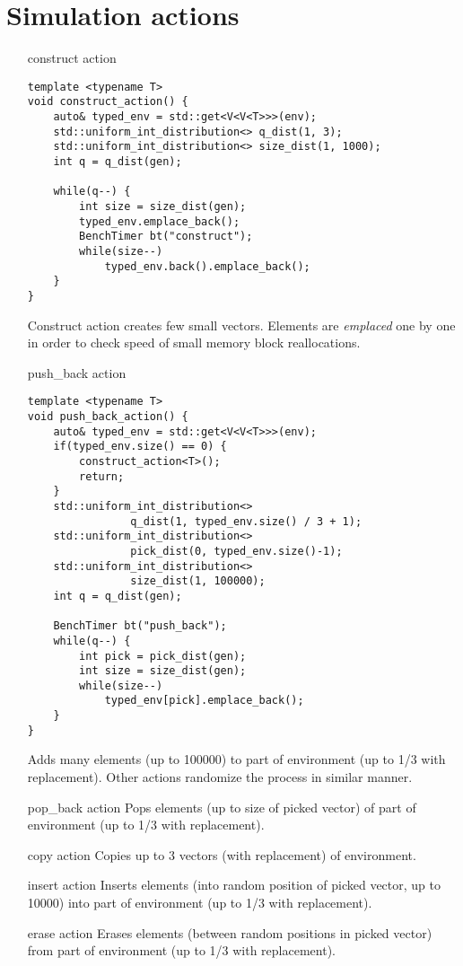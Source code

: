 \documentclass[inz, english, shortabstract]{iithesis}
\begin{document}
\section{Simulation actions}
\begin{itemize}
\item [construct action]
\begin{lstlisting}[caption=construct action]
template <typename T>
void construct_action() {
	auto& typed_env = std::get<V<V<T>>>(env);
	std::uniform_int_distribution<> q_dist(1, 3);
	std::uniform_int_distribution<> size_dist(1, 1000);
	int q = q_dist(gen);
	
	while(q--) {
		int size = size_dist(gen);
		typed_env.emplace_back();
		BenchTimer bt("construct");
		while(size--)
			typed_env.back().emplace_back();
	}
}
\end{lstlisting}
Construct action creates few small vectors. Elements are {\it emplaced} one by one in order to check speed of small memory block reallocations. 

\item [push\_back action]
\begin{lstlisting}[caption=push\_back action]
template <typename T>
void push_back_action() {
	auto& typed_env = std::get<V<V<T>>>(env);
	if(typed_env.size() == 0) {
		construct_action<T>();
		return;
	}
	std::uniform_int_distribution<> 
				q_dist(1, typed_env.size() / 3 + 1);
	std::uniform_int_distribution<> 
				pick_dist(0, typed_env.size()-1);
	std::uniform_int_distribution<> 
				size_dist(1, 100000);
	int q = q_dist(gen);
	
	BenchTimer bt("push_back");
	while(q--) {
		int pick = pick_dist(gen);
		int size = size_dist(gen);
		while(size--)
			typed_env[pick].emplace_back();
	}
}
\end{lstlisting}
Adds many elements (up to 100000) to part of environment (up to 1/3 with replacement). Other actions randomize the process in similar manner.

\item [pop\_back action]
Pops elements (up to size of picked vector) of part of environment (up to 1/3 with replacement). 

\item [copy action]
Copies up to 3 vectors (with replacement) of environment.

\item[insert action]
Inserts elements (into random position of picked vector, up to 10000) into part of environment (up to 1/3 with replacement).

\item[erase action]
Erases elements (between random positions in picked vector) from part of environment (up to 1/3 with replacement).
\end{itemize}
\end{document}
